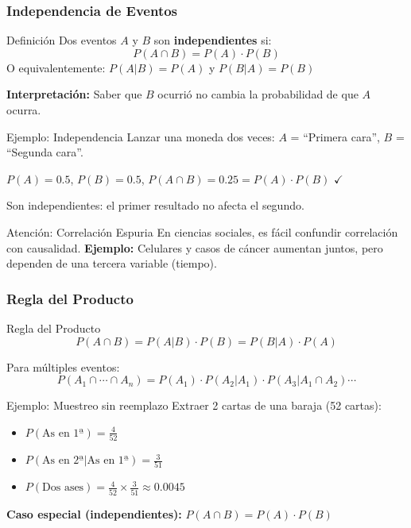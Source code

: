 \documentclass[aspectratio=169,11pt]{beamer}
\begin{document}
\begin{frame}[fragile]
\frametitle{Independencia de Eventos}

\small

\begin{block}{Definición}
Dos eventos $A$ y $B$ son \textbf{independientes} si:
$$P(A \cap B) = P(A) \cdot P(B)$$
O equivalentemente: $P(A|B) = P(A)$ y $P(B|A) = P(B)$
\end{block}

\pause
\vspace{-0.05cm}
\textbf{Interpretación:} Saber que $B$ ocurrió no cambia la probabilidad de que $A$ ocurra.

\pause
\vspace{-0.05cm}
\begin{exampleblock}{Ejemplo: Independencia}
Lanzar una moneda dos veces: $A$ = ``Primera cara'', $B$ = ``Segunda cara''.

$P(A) = 0.5$, $P(B) = 0.5$, $P(A \cap B) = 0.25 = P(A) \cdot P(B)$ $\checkmark$

Son independientes: el primer resultado no afecta el segundo.
\end{exampleblock}

\pause
\vspace{-0.05cm}
\begin{alertblock}{Atención: Correlación Espuria}
En ciencias sociales, es fácil confundir correlación con causalidad.
\textbf{Ejemplo:} Celulares y casos de cáncer aumentan juntos, pero dependen de una tercera variable (tiempo).
\end{alertblock}
\end{frame}

\begin{frame}[fragile]
\frametitle{Regla del Producto}

\small

\begin{block}{Regla del Producto}
$$P(A \cap B) = P(A|B) \cdot P(B) = P(B|A) \cdot P(A)$$

Para múltiples eventos:
$$P(A_1 \cap \cdots \cap A_n) = P(A_1) \cdot P(A_2|A_1) \cdot P(A_3|A_1 \cap A_2) \cdots$$
\end{block}

\pause
\begin{exampleblock}{Ejemplo: Muestreo sin reemplazo}
Extraer 2 cartas de una baraja (52 cartas):
\begin{itemize}
  \item $P(\text{As en 1ª}) = \frac{4}{52}$
  \pause
  \item $P(\text{As en 2ª} | \text{As en 1ª}) = \frac{3}{51}$
  \pause
  \item $P(\text{Dos ases}) = \frac{4}{52} \times \frac{3}{51} \approx 0.0045$
\end{itemize}
\end{exampleblock}

\pause
\smallskip
\textbf{Caso especial (independientes):} $P(A \cap B) = P(A) \cdot P(B)$
\end{frame}
\end{document}
